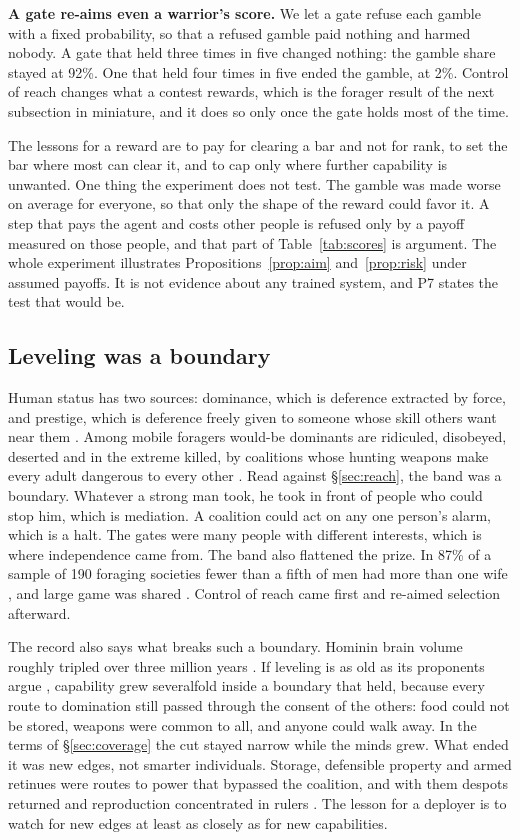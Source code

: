 \documentclass[10pt,twocolumn,letterpaper]{article}
\theoremstyle{definition}
\newcommand{\para}[1]{\smallskip\noindent\textbf{#1}\enspace}
\newcommand{\ScGateSixty}{92}
\newcommand{\ScGateEighty}{2}
\begin{document}
\para{A gate re-aims even a warrior's score.} We let a gate refuse each gamble with a fixed probability, so that a refused gamble paid nothing and harmed nobody. A gate that held three times in five changed nothing: the gamble share stayed at \ScGateSixty\%. One that held four times in five ended the gamble, at \ScGateEighty\%. Control of reach changes what a contest rewards, which is the forager result of the next subsection in miniature, and it does so only once the gate holds most of the time.

The lessons for a reward are to pay for clearing a bar and not for rank, to set the bar where most can clear it, and to cap only where further capability is unwanted. One thing the experiment does not test. The gamble was made worse on average for everyone, so that only the shape of the reward could favor it. A step that pays the agent and costs other people is refused only by a payoff measured on those people, and that part of Table~\ref{tab:scores} is argument. The whole experiment illustrates Propositions~\ref{prop:aim} and~\ref{prop:risk} under assumed payoffs. It is not evidence about any trained system, and P7 states the test that would be.

\subsection{Leveling was a boundary}

Human status has two sources: dominance, which is deference extracted by force, and prestige, which is deference freely given to someone whose skill others want near them \cite{henrich}. Among mobile foragers would-be dominants are ridiculed, disobeyed, deserted and in the extreme killed, by coalitions whose hunting weapons make every adult dangerous to every other \cite{boehm1993,boehm1999,woodburn}. Read against \S\ref{sec:reach}, the band was a boundary. Whatever a strong man took, he took in front of people who could stop him, which is mediation. A coalition could act on any one person's alarm, which is a halt. The gates were many people with different interests, which is where independence came from. The band also flattened the prize. In 87\% of a sample of 190 foraging societies fewer than a fifth of men had more than one wife \cite{walker}, and large game was shared \cite{woodburn}. Control of reach came first and re-aimed selection afterward.

The record also says what breaks such a boundary. Hominin brain volume roughly tripled over three million years \cite{du,taylor}. If leveling is as old as its proponents argue \cite{boehm1999}, capability grew severalfold inside a boundary that held, because every route to domination still passed through the consent of the others: food could not be stored, weapons were common to all, and anyone could walk away. In the terms of \S\ref{sec:coverage} the cut stayed narrow while the minds grew. What ended it was new edges, not smarter individuals. Storage, defensible property and armed retinues were routes to power that bypassed the coalition, and with them despots returned and reproduction concentrated in rulers \cite{betzig}. The lesson for a deployer is to watch for new edges at least as closely as for new capabilities.
\end{document}
